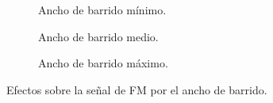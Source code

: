     \begin{figure}[H]
      \centering
      \begin{subfigure}[ht]{0.48\textwidth}
        \caption{Ancho de barrido mínimo.}
        \label{fig:AnchoBarridoMin}
      \end{subfigure}
      \hfill 
      \begin{subfigure}[ht]{0.48\textwidth}
        \caption{Ancho de barrido medio.}
        \label{fig:AnchoBarridoMed}
      \end{subfigure}
      \hfill 
      \begin{subfigure}[ht]{0.48\textwidth}
        \caption{Ancho de barrido máximo.}
        \label{fig:AnchoBarridoMax}
      \end{subfigure}

      \caption{Efectos sobre la señal de FM por el ancho de barrido.}
      \label{fig:EfectoDeAnchoDeBarrido}
    \end{figure}
